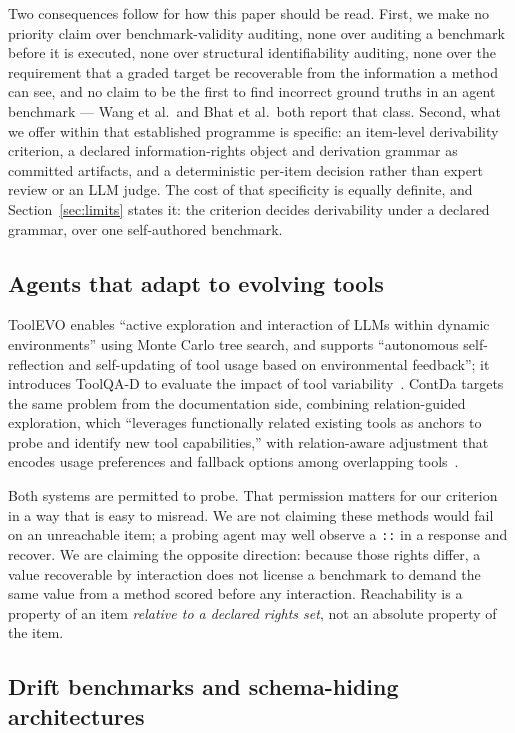 \documentclass[11pt]{article}
\begin{document}
Two consequences follow for how this paper should be read. First, we make no
priority claim over benchmark-validity auditing, none over auditing a
benchmark before it is executed, none over structural identifiability auditing,
none over the requirement that a graded target be recoverable from the
information a method can see, and no claim to be the first to find incorrect
ground truths in an agent benchmark --- Wang et al.\ and Bhat et al.\ both report that
class. Second, what we offer within that established programme is specific: an
item-level derivability criterion, a declared information-rights object and
derivation grammar as committed artifacts, and a deterministic per-item
decision rather than expert review or an LLM judge. The cost of that
specificity is equally definite, and Section~\ref{sec:limits} states it: the
criterion decides derivability under a declared grammar, over one self-authored
benchmark.

\subsection{Agents that adapt to evolving tools}

ToolEVO enables ``active exploration and interaction of LLMs within dynamic
environments'' using Monte Carlo tree search, and supports ``autonomous
self-reflection and self-updating of tool usage based on environmental
feedback''; it introduces ToolQA-D to evaluate the impact of tool
variability~\cite{chen2025toolevo}. ContDa targets the same problem from the
documentation side, combining relation-guided exploration, which ``leverages
functionally related existing tools as anchors to probe and identify new tool
capabilities,'' with relation-aware adjustment that encodes usage preferences
and fallback options among overlapping tools~\cite{wu2026contda}.

Both systems are permitted to probe. That permission matters for our
criterion in a way that is easy to misread. We are not claiming these methods
would fail on an unreachable item; a probing agent may well observe a
\texttt{::} in a response and recover. We are claiming the opposite direction:
because those rights differ, a value recoverable by interaction does not
license a benchmark to demand the same value from a method scored before any
interaction. Reachability is a property of an item \emph{relative to a
declared rights set}, not an absolute property of the item.

\subsection{Drift benchmarks and schema-hiding architectures}
\end{document}

